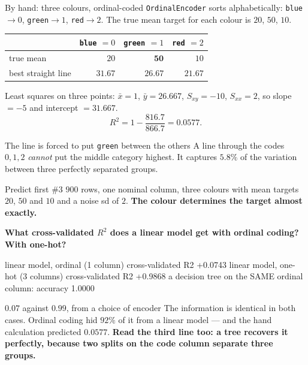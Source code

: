 \documentclass[aspectratio=169]{beamer}
\begin{document}
\begin{frame}[shrink=8]{By hand: three colours, ordinal-coded}
  \texttt{OrdinalEncoder} sorts alphabetically:
  \texttt{blue}$\to 0$, \texttt{green}$\to 1$, \texttt{red}$\to 2$. The true
  mean target for each colour is $20$, $50$, $10$.
  \begin{center}\small
  \begin{tabular}{@{}lrrr@{}}
    \toprule
    & \texttt{blue} $=0$ & \texttt{green} $=1$ & \texttt{red} $=2$\\
    \midrule
    true mean & $20$ & $\mathbf{50}$ & $10$\\
    best straight line & $31.67$ & $26.67$ & $21.67$\\
    \bottomrule
  \end{tabular}
  \end{center}
  \vspace{0.2em}
  Least squares on three points: $\bar x = 1$, $\bar y = 26.667$,
  $S_{xy} = -10$, $S_{xx} = 2$, so slope $=-5$ and intercept $=31.667$.
  \[
    R^2 = 1 - \frac{816.7}{866.7} = \mathbf{0.0577}.
  \]
  \begin{alertblock}{The line is forced to put \texttt{green} between the others}
    \small A line through the codes $0,1,2$ \emph{cannot} put the middle
    category highest. It captures $5.8\%$ of the variation between three
    perfectly separated groups.
  \end{alertblock}
\end{frame}

\begin{frame}[fragile,shrink=6]{Predict first \#3}
$900$ rows, one nominal column, three colours with mean targets $20$, $50$
and $10$ and a noise sd of $2$. \textbf{The colour determines the target
almost exactly.}

\begin{center}
  \textbf{What cross-validated $R^2$ does a linear model get with ordinal
  coding? With one-hot?}
\end{center}
\vspace{0.2em}
\begin{outblk}
linear model, ordinal (1 column)   cross-validated R2 +0.0743
linear model, one-hot (3 columns)  cross-validated R2 +0.9868
a decision tree on the SAME ordinal column: accuracy 1.0000
\end{outblk}
\begin{alertblock}{$0.07$ against $0.99$, from a choice of encoder}
  \footnotesize The information is identical in both cases. Ordinal coding
  hid $92\%$ of it from a linear model --- and the hand calculation predicted
  $0.0577$. \textbf{Read the third line too: a tree recovers it
  perfectly, because two splits on the code column separate three groups.}
\end{alertblock}
\end{frame}
\end{document}
